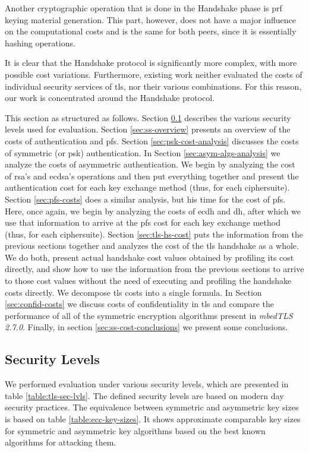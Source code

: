 \documentclass{llncs}
\begin{document}
Another cryptographic operation that is done in the Handshake phase is \gls{prf} keying material generation. This part, however,
does not have a major influence on the computational costs and is the same for both peers, since it is essentially
hashing operations.

It is clear that the Handshake protocol is significantly more complex, with more possible cost variations.
Furthermore, existing work neither evaluated the costs of individual security services of \gls{tls}, nor
their various combinations. For this reason, our work is concentrated around the Handshake protocol.

This section as structured as follows. Section \ref{sec:sls} describes the various security levels used for evaluation. 
Section \ref{sec:ss-overview}
presents an overview of the costs of authentication and \gls{pfs}. Section \ref{sec:psk-cost-analysis} discusses the costs of symmetric (or \gls{psk})
authentication. In Section \ref{sec:asym-algs-analysis} we analyze the costs of asymmetric authentication. We begin by analyzing the cost of \gls{rsa}'s
and \gls{ecdsa}'s  operations and then put everything together and present the authentication cost for each key exchange method (thus, for each ciphersuite).
Section \ref{sec:pfs-costs} does a similar analysis, but his time for the cost of \gls{pfs}. Here, once again, we begin by analyzing the costs of
\gls{ecdh} and \gls{dh}, after which we use that information to arrive at the \gls{pfs} cost for each key exchange method (thus, for each ciphersuite).
Section \ref{sec:tls-hs-cost} puts the information from the previous sections together and analyzes the cost of the \gls{tls} handshake as a whole.
We do both, present actual handshake cost values obtained by profiling its cost directly, and show how to use the information from the previous sections to 
arrive to those cost values without the need of executing and profiling the handshake costs directly. We decompose \gls{tls} costs into a single formula.
In Section \ref{sec:confid-costs} we discuss costs of confidentiality in \gls{tls} and compare the performance of all of the symmetric encryption algorithms
present in \textit{mbedTLS 2.7.0}. Finally, in section \ref{sec:ss-cost-conclusions} we present some conclusions.

\subsection{Security Levels} \label{sec:sls}

We performed evaluation under various security levels, which are presented in table \ref{table:tls-sec-lvls}.
The defined security levels are based on modern day security practices. The equivalence between symmetric and asymmetric
key sizes  is based on table \ref{table:ecc-key-sizes}. It shows approximate comparable key sizes for symmetric
and asymmetric key algorithms based on the best known algorithms for attacking them\cite{RFC4492}.
\end{document}
